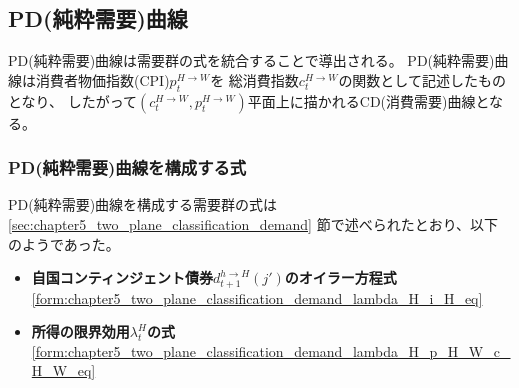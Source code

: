 
\subsection{PD(純粋需要)曲線}
\label{sec:chapter5_two_plane_pd}
PD(純粋需要)曲線は需要群の式を統合することで導出される。
PD(純粋需要)曲線は消費者物価指数(CPI)\(p_t^{H\to W}\)を
総消費指数\(c_t^{H\to W}\)の関数として記述したものとなり、
したがって\((c_t^{H\to W},p_t^{H\to W})\)平面上に描かれるCD(消費需要)曲線となる。

\subsubsection{PD(純粋需要)曲線を構成する式}
\label{sec:chapter5_two_plane_pd_components}
PD(純粋需要)曲線を構成する需要群の式は
\ref{sec:chapter5_two_plane_classification_demand}
節で述べられたとおり、以下のようであった。
\begin{itemize}
    \item \textbf{自国コンティンジェント債券\(d_{t+1}^{h\to H}(j')\)のオイラー方程式} \eqref{form:chapter5_two_plane_classification_demand_lambda_H_i_H_eq}
    \item \textbf{所得の限界効用\(\lambda_t^H\)の式} \eqref{form:chapter5_two_plane_classification_demand_lambda_H_p_H_W_c_H_W_eq}
\end{itemize}

